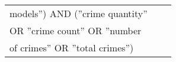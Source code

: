 \begin{longtable}{|l|l|l|}
    models'') AND (''crime quantity''            &                                                      &                                                    \\ \cline{2-3}
    OR ''crime count'' OR ''number               &                                                      &                                                    \\ \cline{2-3}
    of crimes'' OR ''total crimes'')             &                                                      &                                                    \\
\end{longtable}
